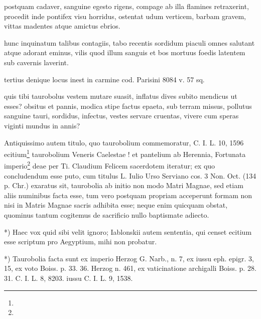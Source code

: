 \documentclass[a4paper, 11pt, oneside, polutonikogreek, german]{article}
\begin{document}
postquam cadaver, sanguine egesto rigens,  
compage ab illa flamines retraxerint,  
procedit inde pontifex visu horridus,  
ostentat udum verticem, barbam gravem,  
vittas madentes atque amictus ebrios.

hunc inquinatum talibus contagiis,  
tabo recentis sordidum piaculi  
omnes salutant atque adorant eminus,  
vilis quod illum sanguis et bos mortuus  
foedis latentem sub cavernis laverint.

tertius denique locus inest in carmine cod. Parisini 8084 v. 57 sq.

quis tibi taurobolus vestem mutare suasit,  
inflatus dives subito mendicus ut esses?  
obsitus et pannis, modica stipe factus epaeta,  
sub terram missus, pollutus sanguine tauri,  
sordidus, infectus, vestes servare cruentas,  
vivere cum speras viginti mundus in annis?

Antiquissimo autem titulo, quo taurobolium commemoratur, C. I. L. 10, 1596 ecitium\footnote{} taurobolium Veneris Caelestae ! et pantelium ab Herennia, Fortunata imperio\footnote{} deae per Ti. Claudium Felicem sacerdotem iteratur; ex quo concludendum esse puto, cum titulus L. Iulio Urso Serviano cos. 3 Non. Oct. (134 p. Chr.) exaratus sit, taurobolia ab initio non modo Matri Magnae, sed etiam aliis numinibus facta esse, tum vero postquam propriam acceperunt formam non nisi in Matris Magnae sacris adhibita esse; neque enim quicquam obstat, quominus tantum cogitemus de sacrificio nullo baptismate adiecto.

*) Haec vox quid sibi velit ignoro; Iablonskii autem sententia, qui censet ecitium esse scriptum pro Aegyptium, mihi non probatur.

*) Taurobolia facta sunt ex imperio Herzog G. Narb., n. 7, ex iussu eph. epigr. 3, 15, ex voto Boiss. p. 33. 36. Herzog n. 461, ex vaticinatione archigalli Boiss. p. 28. 31. C. I. L. 8, 8203. iussu C. I. L. 9, 1538.
\end{document}
